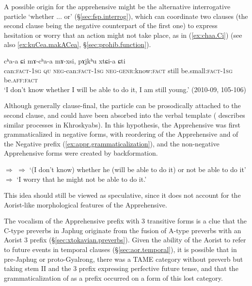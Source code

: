 A possible origin for the apprehensive  might be the alternative interrogative particle  `whether ... or' (§\ref{sec:fsp.interrog}), which can coordinate two clauses (the second clause being the negative counterpart of the first one) to express hesitation or worry that an action might not take place, as in (\ref{ex:chaa.Ci}) (see also  \ref{ex:kuCea.makACea}, §\ref{sec:prohib.function}).
 
 \begin{exe}
\ex \label{ex:chaa.Ci}
\gll  cʰa-a ɕi mɤ-cʰa-a mɤ-xsi, pɤjkʰu xtɕi-a ɕti \\
can:\textsc{fact}-\textsc{1sg} \textsc{qu} \textsc{neg}-can:\textsc{fact}-\textsc{1sg} \textsc{neg}-\textsc{genr}:know:\textsc{fact} still be.small:\textsc{fact}-\textsc{1sg} be.\textsc{aff}:\textsc{fact} \\
\glt `I don't know whether I will be able to do it, I am still young.' (2010-09, 105-106)
\end{exe}
  
Although generally clause-final, the particle    can be prosodically attached to the second clause, and could have been absorbed into the verbal template (\citealt{laiyf20betrayal} describes similar processes in Khroskyabs). In this hypothesis, the Apprehensive was first grammaticalized in negative forms, with reordering of the Apprehensive and of the Negative prefix (\ref{ex:appr.grammaticalization}), and the non-negative Apprehensive forms were created by backformation.

 \begin{exe}
\ex \label{ex:appr.grammaticalization}
\glt {} $\Rightarrow$  $\Rightarrow$  
\glt `(I don't know) whether he (will be able to do it) or not be able to do it' $\Rightarrow$ `I worry that he might not be able to do it.' 
\end{exe}

This idea should still be viewed as speculative, since it does not account for the Aorist-like morphological features of the Apprehensive. 

The  vocalism of the Apprehensive prefix with 3\flobv{} transitive forms is a clue that the C-type preverbs in Japhug originate from the fusion of A-type  preverbs with an Aorist 3\flobv{}  prefix (§\ref{sec:xtokavian.preverbs}). Given the ability of the Aorist to refer to future events in temporal clauses (§\ref{sec:aor.temporal}), it is possible that in pre-Japhug or proto-Gyalrong, there was a TAME category without preverb but taking stem II and the 3\flobv{}  prefix expressing perfective future tense, and that the grammaticalization of  as a prefix occurred on a form of this lost category.

